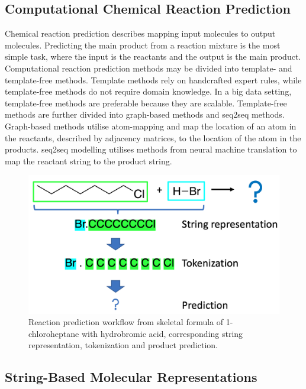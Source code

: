 \documentclass[10pt,conference,compsocconf]{IEEEtran}
\begin{document}
\subsection{Computational Chemical Reaction Prediction}

Chemical reaction prediction describes mapping input molecules to output molecules\cite{ReactionPredictionReview}. Predicting the main product from a reaction mixture is the most simple task, where the input is the reactants and the output is the main product. Computational reaction prediction methods may be divided into template- and template-free methods\cite{MolecularTransformer,SELFIES}. Template methods rely on handcrafted expert rules, while template-free methods do not require domain knowledge. In a big data setting, template-free methods are preferable because they are scalable. Template-free methods are further divided into graph-based methods and seq2seq methods. Graph-based methods utilise atom-mapping and map the location of an atom in the reactants, described by adjacency matrices, to the location of the atom in the products. seq2seq modelling utilises methods from neural machine translation to map the reactant string to the product string. 

\begin{figure}[t!]
    \centering
    \includegraphics[width = .9\linewidth]{./figures/reaction_prediction.png}
    \caption{Reaction prediction workflow from skeletal formula of 1-chloroheptane with hydrobromic acid, corresponding string representation, tokenization and product prediction. }
    \label{fig:chemical_prediction_example}
\end{figure} 

\subsection{String-Based Molecular Representations}
\end{document}
